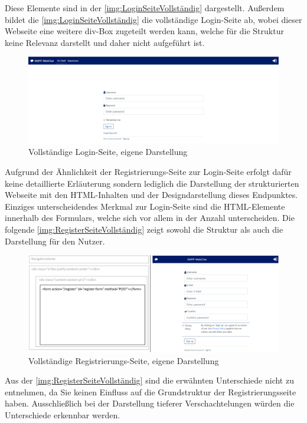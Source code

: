 \documentclass[a4paper,titlepage,halfparskip,12pt]{scrreprt}
\begin{document}
\begin{onehalfspacing}
Diese Elemente sind in der \autoref{img:LoginSeiteVollständig} dargestellt. Außerdem bildet die \autoref{img:LoginSeiteVollständig} die vollständige Login-Seite ab, wobei dieser Webseite eine weitere div-Box zugeteilt werden kann, welche für die Struktur keine Relevanz darstellt und daher nicht aufgeführt ist.
\begin{figure}[h]
	\centering
	\includegraphics[width=\linewidth]{images/loginSeiteFertig}
	\caption{Vollständige Login-Seite, eigene Darstellung}
	\label{img:LoginSeiteVollständig}
\end{figure}
Aufgrund der Ähnlichkeit der Registrierungs-Seite zur Login-Seite erfolgt dafür keine detaillierte Erläuterung sondern lediglich die Darstellung der strukturierten Webseite mit den HTML-Inhalten und der Designdarstellung dieses Endpunktes. Einziges unterscheidendes Merkmal zur Login-Seite sind die HTML-Elemente innerhalb des Formulars, welche sich vor allem in der Anzahl unterscheiden. Die folgende \autoref{img:RegisterSeiteVollständig} zeigt sowohl die Struktur als auch die Darstellung für den Nutzer.
\begin{figure}[h]
	\centering
	\includegraphics[width=\linewidth]{images/RegisterPage2}
	\caption{Vollständige Registrierungs-Seite, eigene Darstellung}
	\label{img:RegisterSeiteVollständig}
\end{figure}
Aus der \autoref{img:RegisterSeiteVollständig} sind die erwähnten Unterschiede nicht zu entnehmen, da Sie keinen Einfluss auf die Grundstruktur der Registrierungsseite haben. Ausschließlich bei der Darstellung tieferer Verschachtelungen würden die Unterschiede erkennbar werden.\\ 

\end{onehalfspacing}
\end{document}
